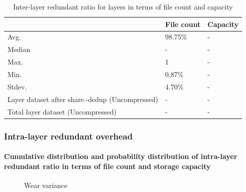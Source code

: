 \begin{table} 
	\centering 
	\scriptsize  
	\caption{Inter-layer redundant ratio for layers in terms of file count and capacity} \label{tbl:across_ratio_layers} 
	\begin{tabular}{|l|l|l|}%
		\hline 
		& File count & Capacity \\
		\hline
		Avg. & 98.75\% & -\\
		\hline
		Median & - & - \\
		\hline
		Max. & 1 & -\\
		\hline
		Min.  & 0.87\%  & -\\
		\hline
		Stdev.  &  4.70\% & -\\
		\hline
		Layer dataset after share.-dedup (Uncompressed) & -  & -\\
		\hline 
		Total layer dataset (Uncompressed) &  -	& -\\
		\hline
	\end{tabular} 
\end{table}

\subsubsection{Intra-layer redundant overhead}

\paragraph{Cumulative distribution and probability distribution of intra-layer redundant ratio in terms of file count and storage capacity}

\begin{figure}
	\centering
	\caption{Wear variance}
	\label{fig:eval-stdev-erasure-cnt}
\end{figure}

